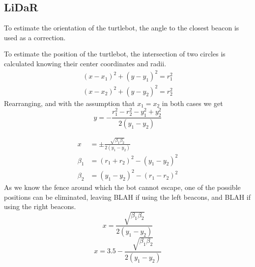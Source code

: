 \documentclass{ieeeaccess}
\begin{document}
\subsection{LiDaR}
	To estimate the orientation of the turtlebot, the angle to the closest beacon is used as a correction.
	
	To estimate the position of the turtlebot, the intersection of two circles is calculated knowing their center coordinates and radii.
	\begin{equation}
	\begin{aligned}
		\left(x-x_{1}\right)^{2} + \left(y-y_{1}\right)^{2}=r_{1}^{2}	\\
		\left(x-x_{2}\right)^{2} + \left(y-y_{2}\right)^{2}=r_{2}^{2}
	\end{aligned}
	\end{equation}
	Rearranging, and with the assumption that $x_{1}=x_{2}$  in both cases we get
	\begin{equation}
		y = -\frac{r_{1}^{2}-r_{2}^{2}-y_{1}^{2}+y_{2}^{2}}{2\left(y_{1}-y_{2}\right)}
	\end{equation}
	
	\begin{equation}
	\begin{aligned}
		x 		&= \pm \frac{\sqrt{\beta_{1}\beta_{2}}}{2\left(y_{1}-y_{2}\right)}	\\
		\beta_{1} 	&= \left(r_{1}+r_{2}\right)^{2}-\left(y_{1}-y_{2}\right)^{2}		\\
		\beta_{2} 	&=\left(y_{1}-y_{2}\right)^{2}-\left(r_{1}-r_{2}\right)^{2}
	\end{aligned}
	\end{equation}
	As we know the fence around which the bot cannot escape, one of the possible positions can be eliminated, leaving BLAH if using the left beacons, and BLAH if using the right beacons.
	\begin{equation}
		x 		= \frac{\sqrt{\beta_{1}\beta_{2}}}{2\left(y_{1}-y_{2}\right)}
	\end{equation}
	\begin{equation}
		x 		= 3.5-\frac{\sqrt{\beta_{1}\beta_{2}}}{2\left(y_{1}-y_{2}\right)}
	\end{equation}
	
	
	
\end{document}
